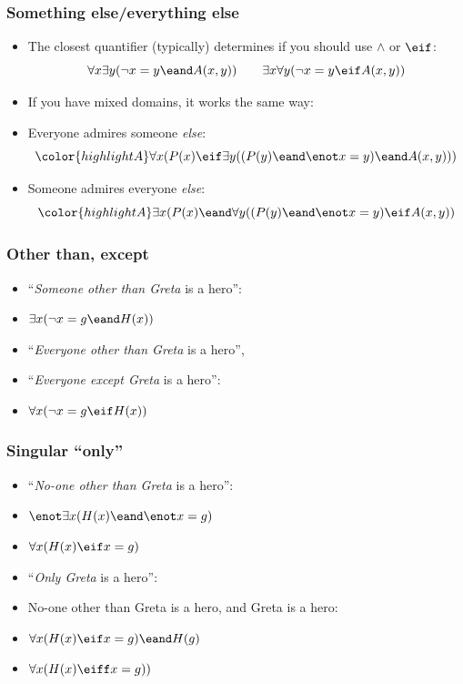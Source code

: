 \begin{frame}
  \frametitle{Something else/everything else}

\begin{itemize}[<+->]
\item The closest quantifier (typically) determines if you should use $\land$ or $\eif$:
\[
  \forall x\exists y(\lnot x = y \eand A(x,y)) \qquad
  \exists x\forall y(\lnot x = y \eif A(x,y))
\]
\item If you have mixed domains, it works the same way:
\item Everyone admires someone \emph{else}:
\[\color{highlightA}
\forall x(P(x) \eif \exists y((P(y) \eand \enot x = y) \eand A(x, y)))
\]
\item Someone admires everyone \emph{else}:
\[\color{highlightA}
\exists x(P(x) \eand \forall y((P(y) \eand \enot x = y) \eif A(x, y))
\]
\end{itemize}
\end{frame}

\begin{frame}
  \frametitle{Other than, except}
  
  
  \begin{itemize}[<+->]
    \item ``\emph{Someone other than Greta} is a hero'':
    \item[] \emph{$\exists x(\lnot x = g \eand H(x))$}
    \item ``\emph{Everyone other than Greta} is a hero'',
    \item ``\emph{Everyone except Greta} is a hero'':
    \item[] \emph{$\forall x(\lnot x = g \eif H(x))$}
    \end{itemize}
\end{frame}


\begin{frame}
  \frametitle{Singular ``only''}

  \begin{itemize}[<+->]
    \item ``\emph{No-one other than Greta} is a hero'':
    \item[] \emph{$\enot\exists x(H(x) \eand \enot x = g)$}
    \item[] \emph{$\forall x(H(x) \eif x = g)$}
    \item ``\emph{Only Greta} is a hero'':
    \item No-one other than Greta is a hero, and Greta is a hero:
    \item[] \emph{$\forall x(H(x) \eif x = g) \eand H(g)$}
    \item[] \emph{$\forall x(H(x) \eiff x = g))$}
  \end{itemize}
  \end{frame}
  
